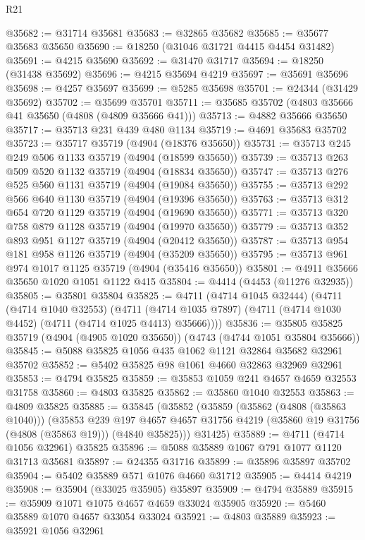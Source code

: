 \begin{lexlean}{R21}
\begin{coremodule}
@35682 := @31714 @35681
@35683 := @32865 @35682
@35685 := @35677 @35683 @35650
@35690 := @18250 (@31046 @31721 @4415 @4454 @31482)
@35691 := @4215 @35690
@35692 := @31470 @31717
@35694 := @18250 (@31438 @35692)
@35696 := @4215 @35694 @4219
@35697 := @35691 @35696
@35698 := @4257 @35697
@35699 := @5285 @35698
@35701 := @24344 (@31429 @35692)
@35702 := @35699 @35701
@35711 := @35685 @35702 (@4803 @35666 @41 @35650 (@4808 (@4809 @35666 @41)))
@35713 := @4882 @35666 @35650
@35717 := @35713 @231 @439 @480 @1134
@35719 := @4691 @35683 @35702
@35723 := @35717 @35719 (@4904 (@18376 @35650))
@35731 := @35713 @245 @249 @506 @1133 @35719 (@4904 (@18599 @35650))
@35739 := @35713 @263 @509 @520 @1132 @35719 (@4904 (@18834 @35650))
@35747 := @35713 @276 @525 @560 @1131 @35719 (@4904 (@19084 @35650))
@35755 := @35713 @292 @566 @640 @1130 @35719 (@4904 (@19396 @35650))
@35763 := @35713 @312 @654 @720 @1129 @35719 (@4904 (@19690 @35650))
@35771 := @35713 @320 @758 @879 @1128 @35719 (@4904 (@19970 @35650))
@35779 := @35713 @352 @893 @951 @1127 @35719 (@4904 (@20412 @35650))
@35787 := @35713 @954 @181 @958 @1126 @35719 (@4904 (@35209 @35650))
@35795 := @35713 @961 @974 @1017 @1125 @35719 (@4904 (@35416 @35650))
@35801 := @4911 @35666 @35650 @1020 @1051 @1122 @415
@35804 := @4414 (@4453 (@11276 @32935))
@35805 := @35801 @35804
@35825 := @4711
    (@4714 @1045 @32444)
    (@4711
      (@4714 @1040 @32553)
      (@4711 (@4714 @1035 @7897) (@4711 (@4714 @1030 @4452) (@4711 (@4714 @1025 @4413) @35666))))
@35836 := @35805 @35825 @35719 (@4904 (@4905 @1020 @35650)) (@4743 (@4744 @1051 @35804 @35666))
@35845 := @5088 @35825 @1056 @435 @1062 @1121 @32864 @35682 @32961 @35702
@35852 := @5402 @35825 @98 @1061 @4660 @32863 @32969 @32961
@35853 := @4794 @35825
@35859 := @35853 @1059 @241 @4657 @4659 @32553 @31758
@35860 := @4803 @35825
@35862 := @35860 @1040 @32553
@35863 := @4809 @35825
@35885 := @35845
    (@35852
      (@35859
        (@35862 (@4808 (@35863 @1040)))
        (@35853
          @239
          @197
          @4657
          @4657
          @31756
          @4219
          (@35860 @19 @31756 (@4808 (@35863 @19)))
          (@4840 @35825)))
      @31425)
@35889 := @4711 (@4714 @1056 @32961) @35825
@35896 := @5088 @35889 @1067 @791 @1077 @1120 @31713 @35681
@35897 := @24355 @31716
@35899 := @35896 @35897 @35702
@35904 := @5402 @35889 @571 @1076 @4660 @31712
@35905 := @4414 @4219
@35908 := @35904 (@33025 @35905) @35897
@35909 := @4794 @35889
@35915 := @35909 @1071 @1075 @4657 @4659 @33024 @35905
@35920 := @5460 @35889 @1070 @4657 @33054 @33024
@35921 := @4803 @35889
@35923 := @35921 @1056 @32961

\end{coremodule}
\end{lexlean}
